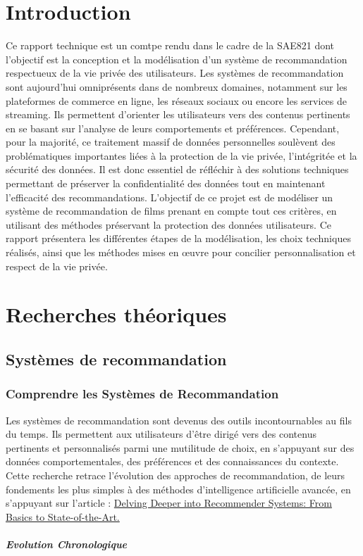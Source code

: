 \documentclass{article}
\begin{document}
    \tableofcontents
    \newpage

    \section*{Introduction}
    Ce rapport technique est un comtpe rendu dans le cadre de la SAE821 dont l'objectif est la conception et la modélisation d’un système de recommandation respectueux de la vie privée des utilisateurs. Les systèmes de recommandation sont aujourd’hui omniprésents dans de nombreux domaines, notamment sur les plateformes de commerce en ligne, les réseaux sociaux ou encore les services de streaming. Ils permettent d’orienter les utilisateurs vers des contenus pertinents en se basant sur l’analyse de leurs comportements et préférences.
    Cependant, pour la majorité, ce traitement massif de données personnelles soulèvent des problématiques importantes liées à la protection de la vie privée, l'intégritée et la sécurité des données. Il est donc essentiel de réfléchir à des solutions techniques permettant de préserver la confidentialité des données tout en maintenant l’efficacité des recommandations.
    L’objectif de ce projet est de modéliser un système de recommandation de films prenant en compte tout ces critères, en utilisant des méthodes préservant la protection des données utilisateurs. Ce rapport présentera les différentes étapes de la modélisation, les choix techniques réalisés, ainsi que les méthodes mises en œuvre pour concilier personnalisation et respect de la vie privée.

    \section{Recherches théoriques}
    \subsection{Systèmes de recommandation}
    \subsubsection{Comprendre les Systèmes de Recommandation}
    Les systèmes de recommandation sont devenus des outils incontournables au fils du temps. Ils permettent aux utilisateurs d'être dirigé vers des contenus pertinents et personnalisés parmi une mutilitude de choix, en s'appuyant sur des données comportementales, des préférences et des connaissances du contexte. Cette recherche retrace l'évolution des approches de recommandation, de leurs fondements les plus simples à des méthodes d'intelligence artificielle avancée, en s'appuyant sur l'article : \href{https://medium.com/@eliasah/delving-deeper-into-recommender-systems-from-basics-to-state-of-the-art-d92ee8e277f2}{ Delving Deeper into Recommender Systems: From Basics to State-of-the-Art.}
    \subparagraph{Evolution Chronologique}
\end{document}
